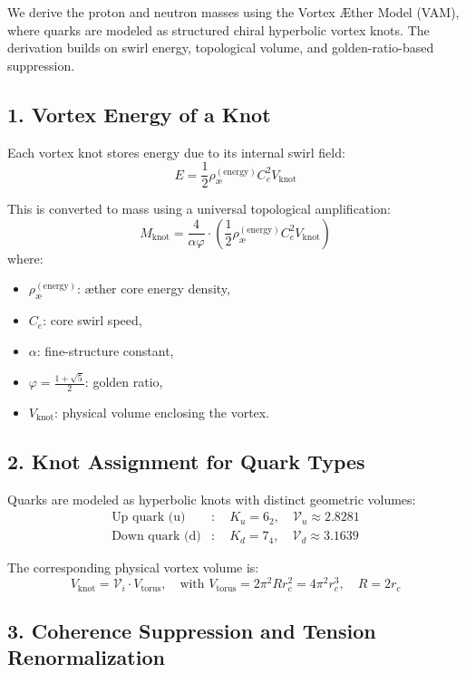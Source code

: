 \documentclass[12pt]{article}
\begin{document}
We derive the proton and neutron masses using the Vortex Æther Model (VAM), where quarks are modeled as structured chiral hyperbolic vortex knots. The derivation builds on swirl energy, topological volume, and golden-ratio-based suppression.

\subsection*{1. Vortex Energy of a Knot}

Each vortex knot stores energy due to its internal swirl field:
\[
E = \frac{1}{2} \rho_\text{\ae}^{(\text{energy})} C_e^2 V_{\text{knot}}
\]

This is converted to mass using a universal topological amplification:
\[
\boxed{
M_{\text{knot}} = \frac{4}{\alpha \varphi} \cdot \left( \frac{1}{2} \rho_\text{\ae}^{(\text{energy})} C_e^2 V_{\text{knot}} \right)
}
\]
where:
\begin{itemize}
  \item \( \rho_\text{\ae}^{(\text{energy})} \): æther core energy density,
  \item \( C_e \): core swirl speed,
  \item \( \alpha \): fine-structure constant,
  \item \( \varphi = \frac{1+\sqrt{5}}{2} \): golden ratio,
  \item \( V_{\text{knot}} \): physical volume enclosing the vortex.
\end{itemize}

\subsection*{2. Knot Assignment for Quark Types}

Quarks are modeled as hyperbolic knots with distinct geometric volumes:
\[
\begin{aligned}
\text{Up quark (u)} &: \quad K_u = 6_2, \quad \mathcal{V}_u \approx 2.8281 \\
\text{Down quark (d)} &: \quad K_d = 7_4, \quad \mathcal{V}_d \approx 3.1639
\end{aligned}
\]

The corresponding physical vortex volume is:
\[
V_{\text{knot}} = \mathcal{V}_i \cdot V_{\text{torus}}, \quad \text{with } V_{\text{torus}} = 2\pi^2 R r_c^2 = 4\pi^2 r_c^3, \quad R = 2r_c
\]

\subsection*{3. Coherence Suppression and Tension Renormalization}
\end{document}
